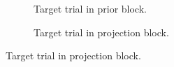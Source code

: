 \documentclass[11pt,fleqn]{article}
\newcommand{\6}{\mbox{$[\hspace*{-.6mm}[$}}
\newcommand{\9}{\mbox{$]\hspace*{-.6mm}]$}}
\begin{document}
\begin{figure}[h!]
\centering

\begin{subfigure}[t]{0.5\textwidth}
        \centering
{}
\caption{Target trial in prior block.}\label{fig-exp1-prior}
\end{subfigure}%
\begin{subfigure}[t]{0.5\textwidth}
\centering
{} 
\caption{Target trial in projection block.}\label{fig-exp1-projection}

\end{subfigure}
\end{figure}
\end{document}

